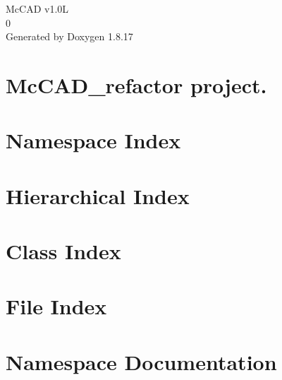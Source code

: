 \let\mypdfximage\pdfximage\def\pdfximage{\immediate\mypdfximage}\documentclass[twoside]{book}
\newcommand{\+}{\discretionary{\mbox{\scriptsize$\hookleftarrow$}}{}{}}
\newcommand{\clearemptydoublepage}{%
  \newpage{\pagestyle{empty}\cleardoublepage}%
}
\begin{document}
\hypersetup{pageanchor=false,
             bookmarksnumbered=true,
             pdfencoding=unicode
            }
\begin{titlepage}
\vspace*{7cm}
\begin{center}%
{\Large Mc\+C\+AD v1.0L \\[1ex]\large 0 }\\
\vspace*{1cm}
{\large Generated by Doxygen 1.8.17}\\
\end{center}
\end{titlepage}
\clearemptydoublepage
{}
\tableofcontents
\clearemptydoublepage
{}
\hypersetup{pageanchor=true}

\chapter{Mc\+C\+A\+D\+\_\+refactor project.}
\label{md__home_mharb_Documents_McCAD_refactor_README}

\chapter{Namespace Index}

\chapter{Hierarchical Index}

\chapter{Class Index}

\chapter{File Index}

\chapter{Namespace Documentation}










\end{document}
